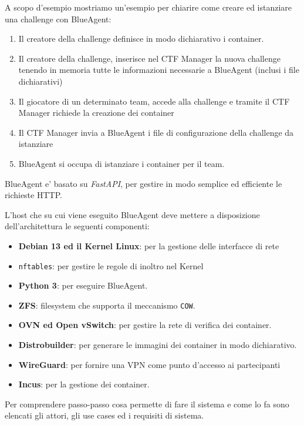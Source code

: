 A scopo d'esempio mostriamo un'esempio per chiarire come creare ed
istanziare una challenge con BlueAgent:

\begin{enumerate}
\def\labelenumi{\arabic{enumi}.}
\tightlist
\item
  Il creatore della challenge definisce in modo dichiarativo i
  container.
\item
  Il creatore della challenge, inserisce nel CTF Manager la nuova
  challenge tenendo in memoria tutte le informazioni necessarie a
  BlueAgent (inclusi i file dichiarativi)
\item
  Il giocatore di un determinato team, accede alla challenge e tramite
  il CTF Manager richiede la creazione dei container
\item
  Il CTF Manager invia a BlueAgent i file di configurazione della
  challenge da istanziare
\item
  BlueAgent si occupa di istanziare i container per il team.
\end{enumerate}

BlueAgent e' basato su \emph{FastAPI}, per gestire in modo semplice ed
efficiente le richieste HTTP.

L'host che su cui viene eseguito BlueAgent deve mettere a disposizione
dell'architettura le seguenti componenti:

\begin{itemize}
\tightlist
\item
  \textbf{Debian 13 ed il Kernel Linux}: per la gestione delle
  interfacce di rete
\item
  \passthrough{\lstinline!nftables!}: per gestire le regole di inoltro
  nel Kernel
\item
  \textbf{Python 3}: per eseguire BlueAgent.
\item
  \textbf{ZFS}: filesystem che supporta il meccanismo
  \passthrough{\lstinline!COW!}.
\item
  \textbf{OVN ed Open vSwitch}: per gestire la rete di verifica dei
  container.
\item
  \textbf{Distrobuilder}: per generare le immagini dei container in modo
  dichiarativo.
\item
  \textbf{WireGuard}: per fornire una VPN come punto d'accesso ai
  partecipanti
\item
  \textbf{Incus}: per la gestione dei container.
\end{itemize}

Per comprendere passo-passo cosa permette di fare il sistema e come lo
fa sono elencati gli attori, gli use cases ed i requisiti di sistema.
